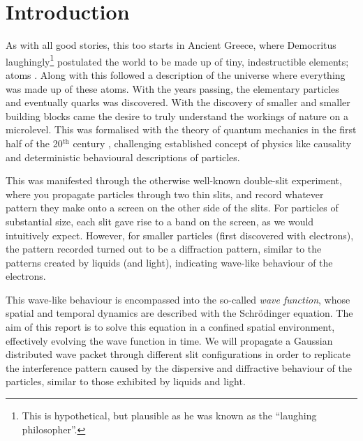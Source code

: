 \section{Introduction}\label{sec:introduction}

As with all good stories, this too starts in Ancient Greece, where Democritus laughingly\footnote{This is hypothetical, but plausible as he was known as the ``laughing philosopher''.} postulated the world to be made up of tiny, indestructible elements; atoms \citep{berryman_2016}. Along with this followed a description of the universe where everything was made up of these atoms. With the years passing, the elementary particles and eventually quarks was discovered. With the discovery of smaller and smaller building blocks came the desire to truly understand the workings of nature on a microlevel. This was formalised with the theory of quantum mechanics in the first half of the 20$^\mathrm{th}$ century \citep{QMH}, challenging established concept of physics like causality and deterministic behavioural descriptions of particles. 

This was manifested through the otherwise well-known double-slit experiment, where you propagate particles through two thin slits, and record whatever pattern they make onto a screen on the other side of the slits. For particles of substantial size, each slit gave rise to a band on the screen, as we would intuitively expect. However, for smaller particles (first discovered with electrons), the pattern recorded turned out to be a diffraction pattern, similar to the patterns created by liquids (and light), indicating wave-like behaviour of the electrons. 

This wave-like behaviour is encompassed into the so-called \textit{wave function}, whose spatial and temporal dynamics are described with the Schrödinger equation. The aim of this report is to solve this equation in a confined spatial environment, effectively evolving the wave function in time. We will propagate a Gaussian distributed wave packet through different slit configurations in order to replicate the interference pattern caused by the dispersive and diffractive behaviour of the particles, similar to those exhibited by liquids and light.

